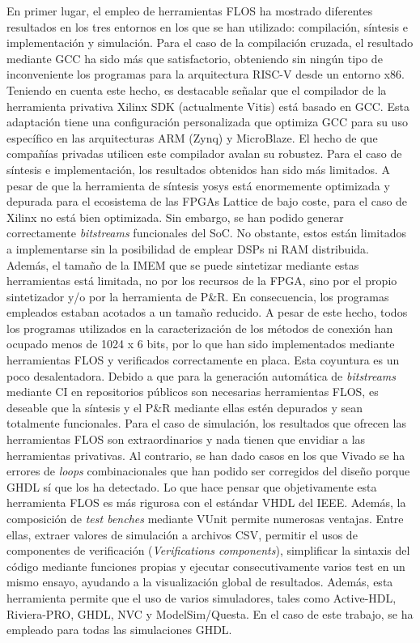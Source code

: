 En primer lugar, el empleo de herramientas FLOS ha mostrado diferentes resultados en los tres entornos en los que se han utilizado: compilación, síntesis e implementación y simulación. 
Para el caso de la compilación cruzada, el resultado mediante GCC ha sido más que satisfactorio, obteniendo sin ningún tipo de inconveniente los programas para la arquitectura RISC-V desde un entorno x86.
Teniendo en cuenta este hecho, es destacable señalar que el compilador de la herramienta privativa Xilinx SDK (actualmente Vitis) está basado en GCC.
Esta adaptación tiene una configuración personalizada que optimiza GCC para su uso específico en las arquitecturas ARM (Zynq) y MicroBlaze.
El hecho de que compañías privadas utilicen este compilador avalan su robustez.
Para el caso de síntesis e implementación, los resultados obtenidos han sido más limitados.
A pesar de que la herramienta de síntesis yosys está enormemente optimizada y depurada para el ecosistema de las FPGAs Lattice de bajo coste, para el caso de Xilinx no está bien optimizada.
Sin embargo, se han podido generar correctamente \textit{bitstreams} funcionales del SoC.
No obstante, estos están limitados a implementarse sin la posibilidad de emplear DSPs ni RAM distribuida.
Además, el tamaño de la IMEM que se puede sintetizar mediante estas herramientas está limitada, no por los recursos de la FPGA, sino por el propio sintetizador y/o por la herramienta de P\&R.
En consecuencia, los programas empleados estaban acotados a un tamaño reducido.
A pesar de este hecho, todos los programas utilizados en la caracterización de los métodos de conexión han ocupado menos de 1024 x 6 bits, por lo que han sido implementados mediante herramientas FLOS y verificados correctamente en placa. 
Esta coyuntura es un poco desalentadora.
Debido a que para la generación automática de \textit{bitstreams} mediante CI en repositorios públicos son necesarias herramientas FLOS, es deseable que la síntesis y el P\&R mediante ellas estén depurados y sean totalmente funcionales.
Para el caso de simulación, los resultados que ofrecen las herramientas FLOS son extraordinarios y nada tienen que envidiar a las herramientas privativas.
Al contrario, se han dado casos en los que Vivado se ha  errores de \textit{loops} combinacionales que han podido ser corregidos del diseño porque GHDL sí que los ha detectado.
Lo que hace pensar que objetivamente esta herramienta FLOS es más rigurosa con el estándar VHDL del IEEE.
Además, la composición de \textit{test benches} mediante VUnit permite numerosas ventajas.
Entre ellas, extraer valores de simulación a archivos CSV, permitir el usos de componentes de verificación (\textit{Verifications components}), simplificar la sintaxis del código mediante funciones propias y ejecutar consecutivamente varios test en un mismo ensayo, ayudando a la visualización global de resultados.
Además, esta herramienta permite que el uso de varios simuladores, tales como Active-HDL, Riviera-PRO, GHDL, NVC y ModelSim/Questa.
En el caso de este trabajo, se ha empleado para todas las simulaciones GHDL.

